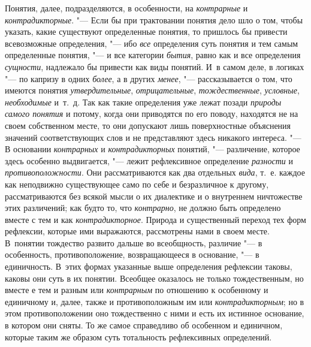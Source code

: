 Понятия, далее, подразделяются, в особенности, на
{\em контрарные} и
{\em контрадикторные}. "---
Если бы при трактовании понятия дело шло о том, чтобы
указать, какие существуют определенные понятия, то пришлось бы привести
всевозможные определения, "--- ибо
{\em все} определения
суть понятия и тем самым определенные понятия, "--- и все
категории {\em бытия},
равно как и все определения
{\em сущности}, надлежало
бы привести как виды понятий. И~в самом деле, в логиках "--- по
капризу в одних {\em более},
а в других {\em менее}, "---
рассказывается о том, что имеются понятия
{\em утвердительные},
{\em отрицательные},
{\em тождественные},
{\em условные},
{\em необходимые} и~т.~д.
Так как такие определения уже лежат позади
{\em природы самого понятия}
и потому, когда они приводятся по его поводу, находятся не на
своем собственном месте, то они допускают лишь поверхностные объяснения
значений соответствующих слов и не представляют здесь никакого интереса. "---
В основании
{\em контрарных} и
{\em контрадикторных}
понятий, "--- различение, которое здесь особенно
выдвигается, "--- лежит рефлексивное определение
{\em разности} и
{\em противоположности}.
Они рассматриваются как два отдельных
{\em вида}, т.~е. каждое
как неподвижно существующее само по себе и безразличное к другому,
рассматриваются без всякой мысли о их диалектике и о внутреннем ничтожестве
этих различений; как будто то, что
{\em контрарно}, не
должно быть определено вместе с тем и как
{\em контрадикторное}.
Природа и существенный переход тех форм рефлексии, которые
ими выражаются, рассмотрены нами в своем месте. В~понятии тождество развито
дальше во всеобщность, различие "--- в особенность,
противоположение, возвращающееся в основание, "--- в
единичность. В~этих формах указанные выше определения рефлексии таковы,
каковы они суть в их понятии. Всеобщее оказалось не только тождественным,
но вместе е тем и разным или
{\em контрарным} по
отношению к особенному и единичному и, далее, также и противоположным им
или {\em контрадикторным};
но в этом противоположении оно тождественно с ними и есть их
истинное основание, в котором они сняты. То же самое справедливо об
особенном и единичном, которые таким же образом суть тотальность
рефлексивных определений.

